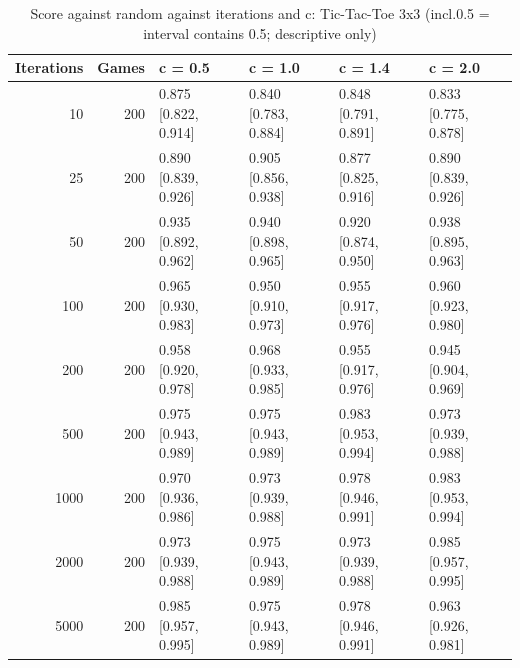 \begin{table}[!t]
\centering
\caption{Score against random against iterations and c: Tic-Tac-Toe 3x3 (incl.0.5 = interval contains 0.5; descriptive only)}
\label{tab:curve_ttt3}
\small
\begin{tabular}{rrllll}
\toprule
Iterations & Games & c = 0.5 & c = 1.0 & c = 1.4 & c = 2.0 \\
\midrule
10 & 200 & 0.875 [0.822, 0.914] & 0.840 [0.783, 0.884] & 0.848 [0.791, 0.891] & 0.833 [0.775, 0.878] \\
25 & 200 & 0.890 [0.839, 0.926] & 0.905 [0.856, 0.938] & 0.877 [0.825, 0.916] & 0.890 [0.839, 0.926] \\
50 & 200 & 0.935 [0.892, 0.962] & 0.940 [0.898, 0.965] & 0.920 [0.874, 0.950] & 0.938 [0.895, 0.963] \\
100 & 200 & 0.965 [0.930, 0.983] & 0.950 [0.910, 0.973] & 0.955 [0.917, 0.976] & 0.960 [0.923, 0.980] \\
200 & 200 & 0.958 [0.920, 0.978] & 0.968 [0.933, 0.985] & 0.955 [0.917, 0.976] & 0.945 [0.904, 0.969] \\
500 & 200 & 0.975 [0.943, 0.989] & 0.975 [0.943, 0.989] & 0.983 [0.953, 0.994] & 0.973 [0.939, 0.988] \\
1000 & 200 & 0.970 [0.936, 0.986] & 0.973 [0.939, 0.988] & 0.978 [0.946, 0.991] & 0.983 [0.953, 0.994] \\
2000 & 200 & 0.973 [0.939, 0.988] & 0.975 [0.943, 0.989] & 0.973 [0.939, 0.988] & 0.985 [0.957, 0.995] \\
5000 & 200 & 0.985 [0.957, 0.995] & 0.975 [0.943, 0.989] & 0.978 [0.946, 0.991] & 0.963 [0.926, 0.981] \\
\bottomrule
\end{tabular}
\end{table}
